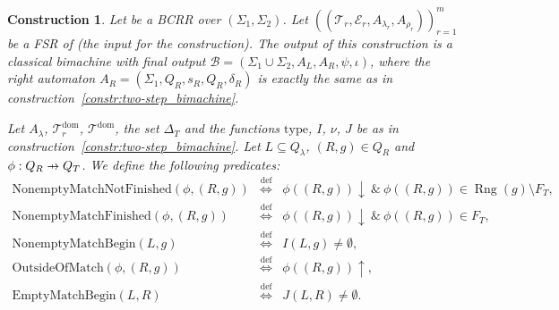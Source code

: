 \documentclass{article}
\newtheorem{construction}[definition]{Construction}
\newcommand\pfun{\mathrel{\ooalign{\hfil$\mapstochar\mkern5mu$\hfil\cr$\to$\cr}}}
\DeclareMathOperator{\Rng}{Rng}
\begin{document}
	\begin{construction} \label{constr:classical_bimachine}
		Let  be a BCRR over $(\Sigma_1, \Sigma_2)$.
		Let $((\mathcal{T}_r, \mathcal{E}_r, A_{\lambda_r}, A_{\rho_r}))_{r=1}^m$ be a FSR of  (the input for the construction).
		The output of this construction is a classical bimachine with final output $\mathcal{B} = (\Sigma_1\cup\Sigma_2, A_L, A_R, \psi, \iota)$, where the right automaton $A_R = (\Sigma_1, Q_R, s_R, Q_R, \delta_R)$ is exactly the same as in construction~\ref{constr:two-step_bimachine}.
		
		Let $A_\lambda$, $\mathcal{T}_r^\mathrm{dom}$, $\mathcal{T}^\mathrm{dom}$, the set $\Delta_T$ and the functions $\mathrm{type}$, $I$, $\nu$, $J$ be as in construction~\ref{constr:two-step_bimachine}.
		Let $L\subseteq Q_\lambda$, $(R,g)\in Q_R$ and $\phi: Q_R\pfun Q_T$. We define the following predicates:
		\begin{eqnarray*}
			\mathrm{NonemptyMatchNotFinished}(\phi, (R, g)) & \stackrel{\mathrm{def}}{\iff} &
				\phi((R,g))\downarrow\ \&\ \phi((R,g))\in \Rng(g)\setminus F_T, \\
			\mathrm{NonemptyMatchFinished}(\phi, (R, g)) & \stackrel{\mathrm{def}}{\iff} & 
				\phi((R,g))\downarrow\ \&\ \phi((R,g))\in F_T, \\
			\mathrm{NonemptyMatchBegin}(L, g) & \stackrel{\mathrm{def}}{\iff} & I(L, g)\ne\emptyset, \\
			\mathrm{OutsideOfMatch}(\phi, (R, g)) & \stackrel{\mathrm{def}}{\iff} & \phi((R,g))\uparrow, \\
			\mathrm{EmptyMatchBegin}(L, R) & \stackrel{\mathrm{def}}{\iff} & J(L, R)\ne\emptyset.
		\end{eqnarray*}
	

\end{construction}
\end{document}
